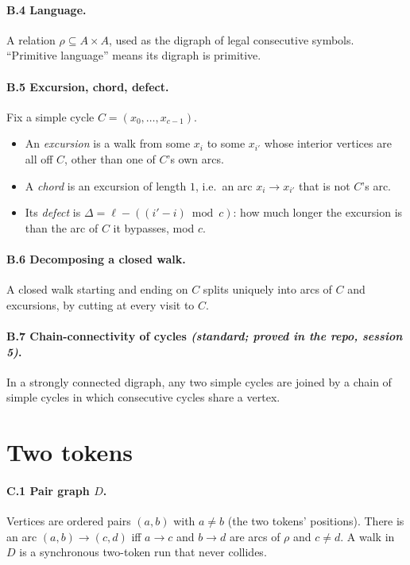 \documentclass[11pt]{article}
\theoremstyle{definition}
\theoremstyle{remark}
\begin{document}
\paragraph{B.4 Language.} A relation $\rho\subseteq A\times A$, used as the
digraph of legal consecutive symbols. ``Primitive language'' means its digraph is
primitive.

\paragraph{B.5 Excursion, chord, defect.} Fix a simple cycle
$C=(x_0,\dots,x_{c-1})$.
\begin{itemize}[nosep]
\item An \emph{excursion} is a walk from some $x_i$ to some $x_{i'}$ whose
  interior vertices are all off $C$, other than one of $C$'s own arcs.
\item A \emph{chord} is an excursion of length $1$, i.e.\ an arc $x_i\to x_{i'}$
  that is not $C$'s arc.
\item Its \emph{defect} is $\Delta=\ell-((i'-i)\bmod c)$: how much longer the
  excursion is than the arc of $C$ it bypasses, mod $c$.
\end{itemize}

\paragraph{B.6 Decomposing a closed walk.} A closed walk starting and ending on $C$
splits uniquely into arcs of $C$ and excursions, by cutting at every visit to
$C$.

\paragraph{B.7 Chain-connectivity of cycles \emph{(standard; proved in the repo,
session 5)}.} In a strongly connected digraph, any two simple cycles are joined by
a chain of simple cycles in which consecutive cycles share a vertex.

\section{Two tokens}

\paragraph{C.1 Pair graph $D$.} Vertices are ordered pairs $(a,b)$ with $a\neq b$
(the two tokens' positions). There is an arc $(a,b)\to(c,d)$ iff $a\to c$ and
$b\to d$ are arcs of $\rho$ and $c\neq d$. A walk in $D$ is a synchronous
two-token run that never collides.
\end{document}

